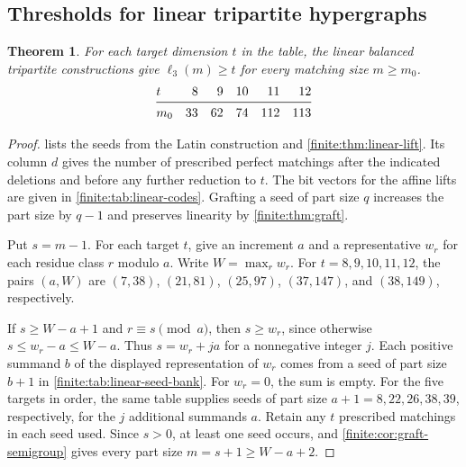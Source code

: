 \documentclass[10pt]{article}
\numberwithin{equation}{section}
\newtheorem{theorem}{Theorem}[section]
\begin{document}
\subsection{Thresholds for linear tripartite hypergraphs}
\begin{theorem}\label{finite:thm:linear-thresholds}
For each target dimension $t$ in the table, the linear balanced tripartite constructions give $\ell_3(m)\ge t$ for every matching size $m\ge m_0$.
\[
\begin{array}{@{}l*{5}{r}@{}}
 t   & 8 & 9 & 10 & 11  & 12\\
 \midrule
 m_0 &33 &62 & 74 &112 &113
\end{array}
\]
\end{theorem}
\begin{proof}
 lists the seeds from the Latin construction and \cref{finite:thm:linear-lift}. Its column $d$ gives the number of prescribed perfect matchings after the indicated deletions and before any further reduction to $t$. The bit vectors for the affine lifts are given in \cref{finite:tab:linear-codes}. Grafting a seed of part size $q$ increases the part size by $q-1$ and preserves linearity by \cref{finite:thm:graft}.

Put $s=m-1$. For each target $t$,  give an increment $a$ and a representative $w_r$ for each residue class $r$ modulo $a$. Write $W=\max_r w_r$. For $t=8,9,10,11,12$, the pairs $(a,W)$ are $(7,38)$, $(21,81)$, $(25,97)$, $(37,147)$, and $(38,149)$, respectively.

If $s\ge W-a+1$ and $r\equiv s\pmod a$, then $s\ge w_r$, since otherwise $s\le w_r-a\le W-a$. Thus $s=w_r+ja$ for a nonnegative integer $j$. Each positive summand $b$ of the displayed representation of $w_r$ comes from a seed of part size $b+1$ in \cref{finite:tab:linear-seed-bank}. For $w_r=0$, the sum is empty. For the five targets in order, the same table supplies seeds of part size $a+1=8,22,26,38,39$, respectively, for the $j$ additional summands $a$. Retain any $t$ prescribed matchings in each seed used. Since $s>0$, at least one seed occurs, and \cref{finite:cor:graft-semigroup} gives every part size $m=s+1\ge W-a+2$.
\end{proof}
\end{document}
